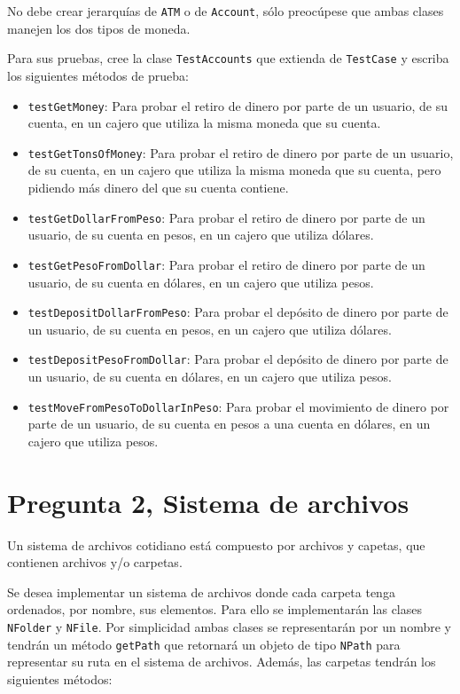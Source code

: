 \documentclass[11pt,spanish,letterpaper]{report}
\begin{document}
No debe crear jerarquías de {\tt ATM} o de {\tt Account}, sólo preocúpese que ambas clases manejen los dos tipos de moneda.


Para sus pruebas, cree la clase {\tt TestAccounts} que extienda de {\tt TestCase} y escriba los siguientes métodos de prueba:

\begin{itemize}
	\item {\tt testGetMoney}: Para probar el retiro de dinero por parte de un usuario, de su cuenta, en un cajero que utiliza la misma moneda que su cuenta.
	\item {\tt testGetTonsOfMoney}: Para probar el retiro de dinero por parte de un usuario, de su cuenta, en un cajero que utiliza la misma moneda que su cuenta, pero pidiendo más dinero del que su cuenta contiene.
	\item {\tt testGetDollarFromPeso}: Para probar el retiro de dinero por parte de un usuario, de su cuenta en pesos, en un cajero que utiliza dólares.
	\item {\tt testGetPesoFromDollar}: Para probar el retiro de dinero por parte de un usuario, de su cuenta en dólares, en un cajero que utiliza pesos.	
	\item {\tt testDepositDollarFromPeso}: Para probar el depósito de dinero por parte de un usuario, de su cuenta en pesos, en un cajero que utiliza dólares.	
	\item {\tt testDepositPesoFromDollar}: Para probar el depósito de dinero por parte de un usuario, de su cuenta en dólares, en un cajero que utiliza pesos.	
	\item {\tt testMoveFromPesoToDollarInPeso}: Para probar el movimiento de dinero por parte de un usuario, de su cuenta en pesos a una cuenta en dólares, en un cajero que utiliza pesos.	
\end{itemize}
\newpage

\section*{Pregunta 2, Sistema de archivos}

Un sistema de archivos cotidiano está compuesto por archivos y capetas, que contienen archivos y/o carpetas.

Se desea implementar un sistema de archivos donde cada carpeta tenga ordenados, por nombre, sus elementos. Para ello se implementarán las clases {\tt NFolder} y {\tt NFile}. Por simplicidad ambas clases se representarán por un nombre y tendrán un método {\tt getPath} que retornará un objeto de tipo {\tt NPath} para representar su ruta en el sistema de archivos. Además, las carpetas tendrán los siguientes métodos:
\end{document}
